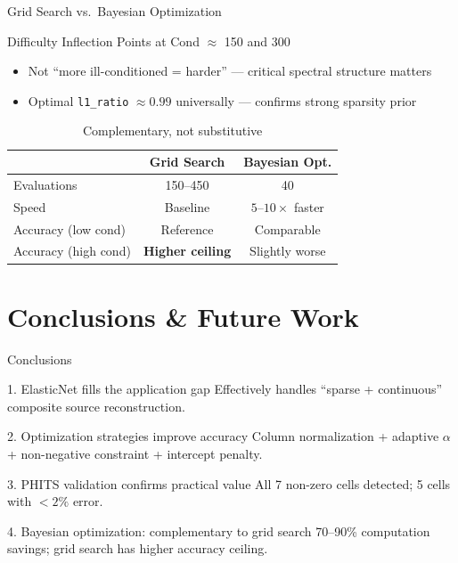 \documentclass{sysupptthesis}
\begin{document}
\begin{frame}{Grid Search vs.\ Bayesian Optimization}
    \begin{block}{Difficulty Inflection Points at Cond $\approx$ 150 and 300}
        \begin{itemize}\footnotesize
            \item Not ``more ill-conditioned = harder'' --- critical spectral structure matters
            \item Optimal \texttt{l1\_ratio} $\approx 0.99$ universally --- confirms strong sparsity prior
        \end{itemize}
    \end{block}

    \begin{table}
        \centering\footnotesize
        \begin{tabular}{lcc}
            \hline
            & \textbf{Grid Search} & \textbf{Bayesian Opt.} \\
            \hline
            Evaluations & 150--450 & 40 \\
            Speed & Baseline & $5\text{--}10\times$ faster \\
            Accuracy (low cond) & Reference & Comparable \\
            Accuracy (high cond) & \textbf{Higher ceiling} & Slightly worse \\
            \hline
        \end{tabular}
        \caption{Complementary, not substitutive}
    \end{table}
\end{frame}

\section{Conclusions \& Future Work}

\begin{frame}{Conclusions}
    \begin{block}{1. ElasticNet fills the application gap}
        \small Effectively handles ``sparse + continuous'' composite source reconstruction.
    \end{block}

    \begin{block}{2. Optimization strategies improve accuracy}
        \small Column normalization + adaptive $\alpha$ + non-negative constraint + intercept penalty.
    \end{block}

    \begin{block}{3. PHITS validation confirms practical value}
        \small All 7 non-zero cells detected; 5 cells with $<2\%$ error.
    \end{block}

    \begin{block}{4. Bayesian optimization: complementary to grid search}
        \small 70--90\% computation savings; grid search has higher accuracy ceiling.
    \end{block}
\end{frame}
\end{document}
